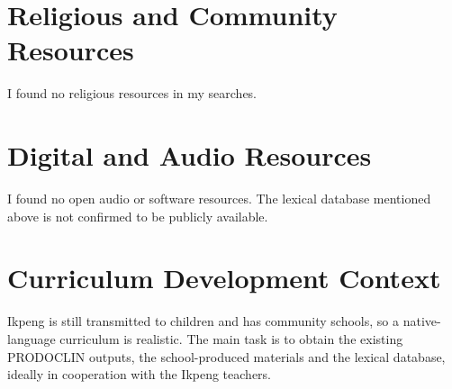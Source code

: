 \documentclass[12pt]{article}
\begin{document}
\section{Religious and Community Resources}
I found no religious resources in my searches.

\section{Digital and Audio Resources}
I found no open audio or software resources. The lexical database mentioned above is not confirmed to be publicly available.

\section{Curriculum Development Context}
Ikpeng is still transmitted to children and has community schools, so a native-language curriculum is realistic. The main task is to obtain the existing PRODOCLIN outputs, the school-produced materials and the lexical database, ideally in cooperation with the Ikpeng teachers.
\end{document}
